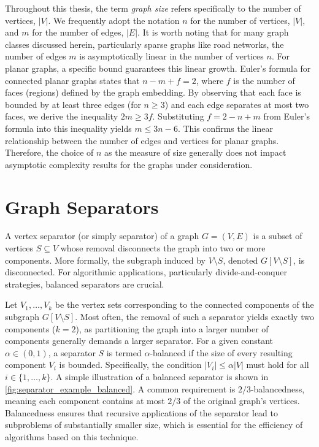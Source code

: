 Throughout this thesis, the term \emph{graph size} refers specifically to the number of vertices, \(|V|\).
We frequently adopt the notation \(n\) for the number of vertices, \(|V|\), and \(m\) for the number of edges, \(|E|\).
It is worth noting that for many graph classes discussed herein, particularly sparse graphs like road networks, the number of edges \(m\) is asymptotically linear in the number of vertices \(n\).
For planar graphs, a specific bound guarantees this linear growth.
Euler's formula for connected planar graphs states that \(n - m + f = 2\), where \(f\) is the number of faces (regions) defined by the graph embedding.
By observing that each face is bounded by at least three edges (for \(n \ge 3\)) and each edge separates at most two faces, we derive the inequality \(2m \ge 3f\).
Substituting \(f = 2 - n + m\) from Euler's formula into this inequality yields \(m \le 3n - 6\).
This confirms the linear relationship between the number of edges and vertices for planar graphs.
Therefore, the choice of \(n\) as the measure of size generally does not impact asymptotic complexity results for the graphs under consideration.

\section{Graph Separators}
\label{sec:graphseparators}

A vertex separator (or simply separator) of a graph \(G = (V, E)\) is a subset of vertices \(S \subseteq V\) whose removal disconnects the graph into two or more components.
More formally, the subgraph induced by \(V \setminus S\), denoted \(G[V \setminus S]\), is disconnected.
For algorithmic applications, particularly divide-and-conquer strategies, balanced separators are crucial.

Let \(V_1, \dots, V_k\) be the vertex sets corresponding to the connected components of the subgraph \(G[V \setminus S]\).
Most often, the removal of such a separator yields exactly two components (\(k=2\)), as partitioning the graph into a larger number of components generally demands a larger separator.
For a given constant \(\alpha \in (0, 1)\), a separator \(S\) is termed \(\alpha\)-balanced if the size of every resulting component \(V_i\) is bounded.
Specifically, the condition \(|V_i| \leq \alpha |V|\) must hold for all \(i \in \{1, \dots, k\}\).
A simple illustration of a balanced separator is shown in \cref{fig:separator_example_balanced}.
A common requirement is \(2/3\)-balancedness, meaning each component contains at most \(2/3\) of the original graph's vertices.
Balancedness ensures that recursive applications of the separator lead to subproblems of substantially smaller size, which is essential for the efficiency of algorithms based on this technique.

